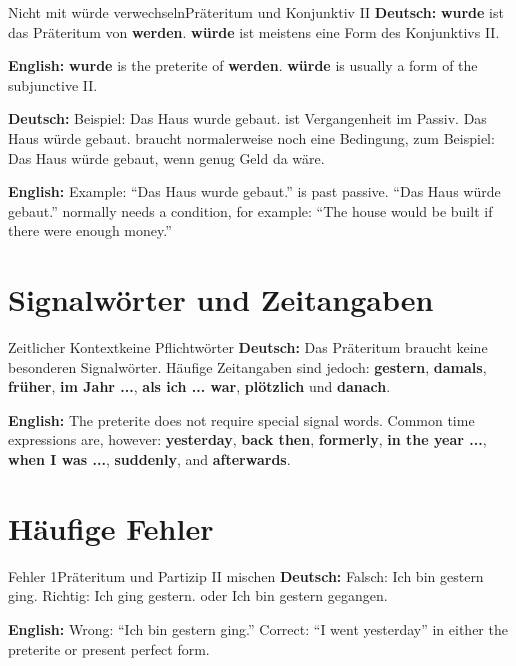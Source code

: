 \documentclass[a4paper,11pt]{article}
\newcommand{\GermanText}[1]{\textbf{Deutsch: }#1\par}
\newcommand{\EnglishText}[1]{{\small\color{SoftGray}\textbf{English: }#1\par}}
\begin{document}
        \begin{grammarentry}{Nicht mit würde verwechseln}{Präteritum und Konjunktiv II}
            \GermanText{\textbf{wurde} ist das Präteritum von \textbf{werden}. \textbf{würde} ist meistens eine Form des Konjunktivs II.}
            \EnglishText{\textbf{wurde} is the preterite of \textbf{werden}. \textbf{würde} is usually a form of the subjunctive II.}
            
            \GermanText{Beispiel: \glqq Das Haus wurde gebaut.\grqq{} ist Vergangenheit im Passiv. \glqq Das Haus würde gebaut.\grqq{} braucht normalerweise noch eine Bedingung, zum Beispiel: \glqq Das Haus würde gebaut, wenn genug Geld da wäre.\grqq}
            \EnglishText{Example: ``Das Haus wurde gebaut.'' is past passive. ``Das Haus würde gebaut.'' normally needs a condition, for example: ``The house would be built if there were enough money.''}
        \end{grammarentry}
    
    
    \section{Signalwörter und Zeitangaben}
        
        \begin{grammarentry}{Zeitlicher Kontext}{keine Pflichtwörter}
            \GermanText{Das Präteritum braucht keine besonderen Signalwörter. Häufige Zeitangaben sind jedoch: \textbf{gestern}, \textbf{damals}, \textbf{früher}, \textbf{im Jahr ...}, \textbf{als ich ... war}, \textbf{plötzlich} und \textbf{danach}.}
            \EnglishText{The preterite does not require special signal words. Common time expressions are, however: \textbf{yesterday}, \textbf{back then}, \textbf{formerly}, \textbf{in the year ...}, \textbf{when I was ...}, \textbf{suddenly}, and \textbf{afterwards}.}
        \end{grammarentry}
    
    
    \section{Häufige Fehler}
        
        \begin{grammarentry}{Fehler 1}{Präteritum und Partizip II mischen}
            \GermanText{Falsch: \glqq Ich bin gestern ging.\grqq{} Richtig: \glqq Ich ging gestern.\grqq{} oder \glqq Ich bin gestern gegangen.\grqq}
            \EnglishText{Wrong: ``Ich bin gestern ging.'' Correct: ``I went yesterday'' in either the preterite or present perfect form.}
        \end{grammarentry}
        
\end{document}
